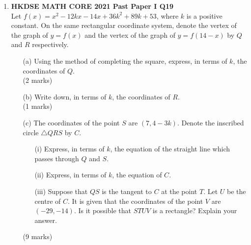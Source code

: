 \documentclass[12pt]{article}
\begin{document}
\begin{enumerate}
	\item \textbf{HKDSE MATH CORE 2021 Past Paper I Q19}\\
	Let $f(x) = x^2 - 12kx -14x + 36k^2 + 89k + 53$, where $k$ is a positive constant. On the same rectangular coordinate system, denote the vertex of the graph of $y = f(x)$ and the vertex of the graph of $y  = f(14 - x)$ by $Q$ and $R$ respectively.
	\begin{enumerate}
		\item[(a)] Using the method of completing the square, express, in terms of $k$, the coordinates of $Q$. \\(2 marks)
		\item[(b)] Write down, in terms of $k$, the coordinates of $R$. \\(1 marks)
		\item[(c)] The coordinates of the point $S$ are $(7, 4 - 3k)$. Denote the inscribed circle $\triangle QRS$ by $C$.
		\begin{enumerate}
			\item[(i)] Express, in terms of $k$, the equation of the straight line which passes through $Q$ and $S$.
			\item[(ii)] Express, in terms of $k$, the equation of $C$.
			\item[(iii)] Suppose that $QS$ is the tangent to $C$ at the point $T$. Let $U$ be the centre of $C$. It is given that the coordinates of the point $V$ are $(-29, -14)$. Is it possible that $STUV$ is a rectangle? Explain your answer.
		\end{enumerate}
		(9 marks)
	\end{enumerate}


\end{enumerate}
\end{document}
